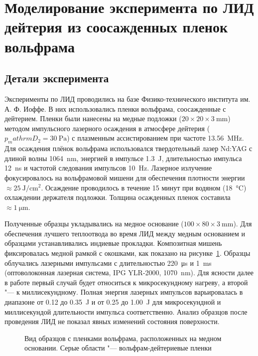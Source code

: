 \section{Моделирование эксперимента по ЛИД дейтерия из соосажденных пленок вольфрама}\label{sec:ch4/sec1}

\subsection{Детали эксперимента}\label{subsec:ch4/sec1/subsec1}

Эксперименты по ЛИД проводились на базе Физико-технического института им. А. Ф. Иоффе. В них использовались пленки вольфрама, соосажденные с дейтерием. Пленки были нанесены на медные подложки ($20 \times 20 \times \SI{3}{\milli\metre}$) методом импульсного лазерного осаждения в атмосфере дейтерия (\(p_mathrm{D_2}=\SI{30}{\pascal}\)) с плазменным ассистированием при частоте \SI{13.56}{\mega\hertz}. Для осаждения плёнок вольфрама использовался твердотельный лазер Nd:YAG с длиной волны \SI{1064}{\nano\meter}, энергией в импульсе \SI{1.3}{\joule}, длительностью импульса \SI{12}{\nano\second} и частотой следования импульсов \SI{10}{\hertz}. Лазерное излучение фокусировалось на вольфрамовой мишени для обеспечения плотности энергии $\approx\SI{25}{\joule\per\centi\meter\squared}$. Осаждение проводилось в течение 15 минут при водяном (\SI{18}{\degreeCelsius}) охлаждении держателя подложки. Толщина осажденных пленок составила $\approx\SI{1}{\micro\metre}$.

Полученные образцы укладывались на медное основание ($100 \times 80 \times \SI{3}{\milli\metre}$). Для обеспечения лучшего теплоотвода во время ЛИД между медным основанием и образцами устанавливались индиевые прокладки. Композитная мишень фиксировалась медной рамкой с окошками, как показано на рисунке~\cref{fig:ch4/LID_target}. Образцы облучались лазерными импульсами с длительностью \SI{220}{\micro\second} и \SI{1}{\milli\second} (оптоволоконная лазерная система, IPG YLR-2000, \SI{1070}{\nano\metre}). Для ясности далее в работе первый случай будет относиться к микросекундному нагреву, а второй "--- к миллисекундному. Полная энергия лазерных импульсов варьировалась в диапазоне от \num{0.12} до \SI{0.35}{\joule} и от \num{0.25} до \SI{1.00}{\joule} для микросекундной и миллисекундой длительности импульса соответственно. Анализ образцов после проведения ЛИД не показал явных изменений состояния поверхности.

\begin{figure}[ht]
    \caption{Вид образцов с пленками вольфрама, расположенных на медном основании. Серые области "--- вольфрам-дейтериевые пленки}\label{fig:ch4/LID_target}
\end{figure}

